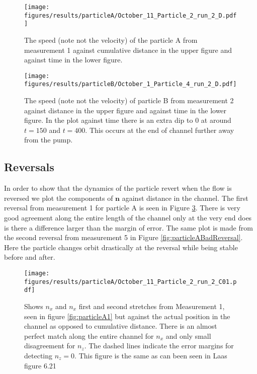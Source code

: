 \begin{figure}[H]
\begin{center}
\texttt{[image: figures/results/particleA/October\_11\_Particle\_2\_run\_2\_D.pdf]}
\end{center}
\caption{The speed (note not the velocity) of the particle A from measurement 1 against cumulative distance in the upper figure and against time in the lower figure.}
\label{fig:particleAspeed}
\end{figure}


\begin{figure}[H]
\begin{center}
\texttt{[image: figures/results/particleB/October\_1\_Particle\_4\_run\_2\_D.pdf]}
\end{center}
\caption{The speed (note not the velocity) of particle B from measurement 2 against distance in the upper figure and against time in the lower figure. In the plot against time there is an extra dip to 0 at around $t=150$ and $t=400$. This occurs at the end of channel further away from the pump.}
\label{fig:particleB1speed}
\end{figure}


\subsection{Reversals}
In order to show that the dynamics of the particle revert when the flow is reversed we plot the components of $\mathbf{n}$ against distance in the channel. The first reversal from measurement 1 for particle A is seen in Figure \ref{fig:particleAreversegood}. There is very good agreement along the entire length of the channel only at the very end does is there a difference larger than the margin of error. The same plot is made from the second reversal from measurement 5 in Figure \ref{fig:particleABadReversal}. Here the particle changes orbit drastically at the reversal while being stable before and after. 

\begin{figure}[H]
\begin{center}
\texttt{[image: figures/results/particleA/October\_11\_Particle\_2\_run\_2\_C01.pdf]}
\end{center}
\caption{Shows $n_x$ and $n_x$ first and second stretches from Measurement 1, seen in figure \ref{fig:particleA1} but against the actual position in the channel as opposed to cumulative distance. There is an almost perfect match along the entire channel for $n_x$ and only small disagreement for $n_z$. The dashed lines indicate the error margins for detecting $n_z=0$. This figure is the same as can been seen in Laas\cite{alexanderThesis} figure 6.21}
\label{fig:particleAreversegood}
\end{figure}

